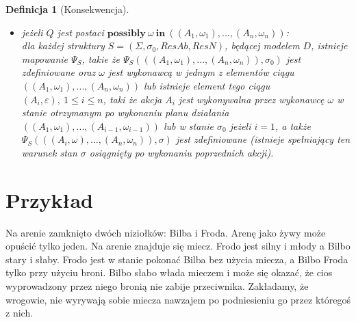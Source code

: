 \documentclass[11pt,a4paper]{article}
\newtheorem{definition}{Definicja}[section]
\begin{document}
\begin{definition}[Konsekwencja]
\begin{itemize}
    	 \item jeżeli $Q$ jest postaci $\mathbf{possibly}~\omega~\mathbf{in}~((A_1, \omega_1),...,(A_n,\omega_n))$: \\
    	 dla każdej struktury $S=(\Sigma, \sigma_0, ResAb, ResN)$, będącej modelem $D$, istnieje mapowanie $\Psi_S$, takie że $\Psi_S(((A_1, \omega_1), ..., (A_n, \omega_n)), \sigma_0)$ jest zdefiniowane oraz $\omega$ jest wykonawcą w jednym z elementów ciągu $((A_1, \omega_1),...,(A_n,\omega_n))$ lub istnieje element tego ciągu $(A_i, \varepsilon),~1 \leq i \leq n$, taki że akcja $A_i$ jest wykonywalna przez wykonawcę $\omega$ w stanie otrzymanym po wykonaniu planu działania $((A_1, \omega_1),...,(A_{i-1},\omega_{i-1}))$ lub w stanie $\sigma_0$ jeżeli $i=1$, a także $\Psi_S(((A_i, \omega), ..., (A_n, \omega_n)), \sigma)$ jest zdefiniowane (istnieje spełniający ten warunek stan $\sigma$ osiągnięty po wykonaniu poprzednich akcji).
    \end{itemize}
    \end{definition}
    
    \section{Przykład}
    
    Na arenie zamknięto dwóch niziołków: Bilba i Froda. Arenę jako żywy może opuścić tylko jeden. Na arenie znajduje się miecz. Frodo jest silny i młody a Bilbo stary i słaby. Frodo jest w stanie pokonać Bilba bez użycia miecza, a Bilbo Froda tylko przy użyciu broni. Bilbo słabo włada mieczem i może się okazać, że cios wyprowadzony przez niego bronią nie zabije przeciwnika. Zakładamy, że wrogowie, nie wyrywają sobie miecza nawzajem po podniesieniu go przez któregoś z nich.
    
\end{document}
